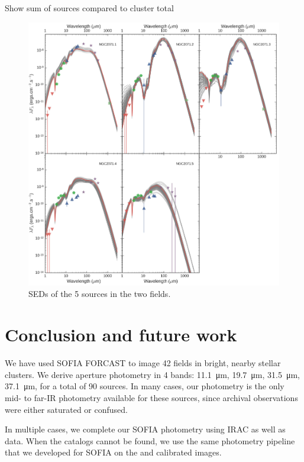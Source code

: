 Show sum of sources compared to cluster total


\begin{figure}
\begin{center}
\includegraphics[width=\textwidth]{Figures/NGC2071_SEDs.jpg}
\caption[NGC2071 SEDs]{SEDs of the 5 sources in the two fields. }
\label{fig:NGC2071_SEDs}
\end{center}
\end{figure}



\section{Conclusion and future work}

We have used SOFIA FORCAST to image 42 fields in bright, nearby stellar clusters. We derive aperture photometry in 4 bands: \SI{11.1}{\um}, \SI{19.7}{\um}, \SI{31.5}{\um}, \SI{37.1}{\um}, for a total of 90 sources. In many cases, our photometry is the only mid- to far-IR photometry available for these sources, since archival \Spitzer observations were either saturated or confused.

In multiple cases, we complete our SOFIA photometry using \Spitzer IRAC as well as \Herschel data. When the catalogs cannot be found, we use the same photometry pipeline that we developed for SOFIA on the \Spitzer and \Herschel calibrated images.

